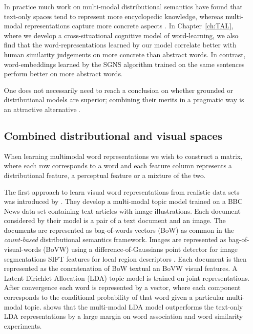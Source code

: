 In practice much work on multi-modal distributional semantics have found that text-only spaces tend to
represent more encyclopedic knowledge, whereas multi-modal representations capture more concrete aspects
\citep{andrews2009integrating,baroni2008concepts}. In Chapter~\ref{ch:TAL}, where we develop
a cross-situational cognitive model of word-learning, we also find that the word-representations learned by
our model correlate better with human similarity judgements on more concrete than abstract words.
In contrast, word-embeddings learned by the SGNS algorithm trained on the same sentences
perform better on more abstract words.

One does not necessarily need to reach a conclusion on whether grounded or distributional
models are superior;  combining their merits in a
pragmatic way is an attractive alternative \citep{riordan2011redundancy}.


\subsection{Combined distributional and visual spaces}
\label{sec:distvis}

When learning multimodal word representations we wish to construct a matrix,
where each row 
corresponds to a word and each feature column
represents a distributional feature, a perceptual feature or a mixture of the two.

The first approach to learn visual word representations from realistic data sets
was introduced by \cite{feng2010visual}. They develop a multi-modal topic model trained on a
BBC News data set containing text articles with image illustrations.
Each document considered by their model is a pair of a text document  and  an image.
The documents are represented as bag-of-words vectors (BoW) as common in the
\emph{count-based} distributional semantics framework. Images are represented
as bag-of-visual-words (BoVW)  \citep{csurka2004visual} using a
difference-of-Gaussians point detector for image segmentations
SIFT features for local region descriptors \citep{lowe1999object}.
Each document is then represented as the concatenation of BoW textual an BoVW visual features.
A Latent Dirichlet Allocation (LDA) \citep{blei2003latent} topic model is trained
on joint representations. After convergence each word is represented by a vector,
where each component corresponds to the conditional probability of that word given
a particular multi-modal topic. \cite{feng2010visual}
shows that the multi-modal LDA model outperforms the text-only LDA representations by a
large margin on word association and word similarity experiments.

